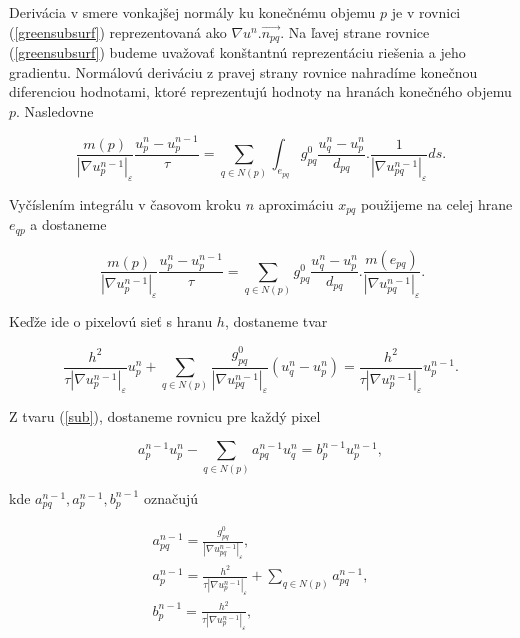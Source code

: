 \documentclass[a4paper,11pt,oneside]{article}%
\def\epsilon{\varepsilon}
\begin{document}
Derivácia v smere vonkajšej normály ku konečnému objemu $p$ je v rovnici (\ref{greensubsurf}) reprezentovaná ako $\nabla u^n.\vec{n_{pq}}$. Na ľavej strane rovnice (\ref{greensubsurf}) budeme uvažovať konštantnú reprezentáciu riešenia a jeho gradientu. Normálovú deriváciu z pravej strany rovnice nahradíme konečnou diferenciou hodnotami, ktoré reprezentujú hodnoty na hranách konečného objemu $p$. Nasledovne

\begin{equation}
\frac{m(p)}{|\nabla u_p^{n-1}|_{\epsilon}}\frac{u_p^n-u_p^{n-1}}{\tau} = \sum_{q \in N(p)}\int_{e_{pq}}g_{pq}^0\frac{u_q^n - u_p^n}{d_{pq}}.\frac{1}{|\nabla u_{pq}^{n-1}|_{\epsilon}}ds.
\end{equation}

Vyčíslením integrálu v časovom kroku $n$ aproximáciu $x_{pq}$ použijeme na celej hrane $e_{qp}$ a dostaneme

\begin{equation} \
\frac{m(p)}{|\nabla u_p^{n-1}|_{\epsilon}}\frac{u_p^n-u_p^{n-1}}{\tau} = \sum_{q \in N(p)}g_{pq}^0\frac{u_q^n - u_p^n}{d_{pq}}.\frac{m(e_{pq})}{|\nabla u_{pq}^{n-1}|_{\epsilon}}.
\end{equation}

Keďže ide o pixelovú sieť s hranu $h$, dostaneme tvar

\begin{equation} \label{sub}
\frac{h^2}{\tau|\nabla u_p^{n-1}|_{\epsilon}}u_p^n + \sum_{q \in N(p)}\frac{g_{pq}^0}{|\nabla u_{pq}^{n-1}|_{\epsilon}}(u_q^n - u_p^n) = \frac{h^2}{\tau|\nabla u_p^{n-1}|_{\epsilon}}u_p^{n - 1}.
\end{equation}

Z tvaru (\ref{sub}), dostaneme rovnicu pre každý pixel

\begin{equation}
a_p^{n - 1}u_p^n - \sum_{q \in N(p)} a_{pq}^{n - 1}u_q^n =b_p^{n-1}u_p^{n-1},
\end{equation}

kde $a_{pq}^{n - 1}, a_p^{n - 1}, b_p^{n - 1}$ označujú

\begin{equation}
\begin{array}{l}
a_{pq}^{n - 1}  = \frac{g_{pq}^{0}}{|\nabla u_{pq}^{n-1}|_{\epsilon}}, \\
a_p^{n - 1} = \frac{h^2}{\tau|\nabla u_p^{n-1}|_{\epsilon}} + \sum_{q \in N(p)} a_{pq}^{n - 1}, \\
b_p^{n - 1} = \frac{h^2}{\tau|\nabla u_p^{n-1}|_{\epsilon}}, \\
\end{array}
\end{equation}
\end{document}
